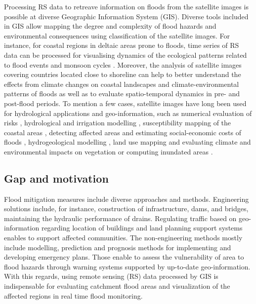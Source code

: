 \documentclass[water,article,submit,pdftex,moreauthors]{Definitions/mdpi}
\begin{document}
Processing RS data to retreave information on floods from the satellite images is possible at diverse Geographic Information System (GIS). Diverse tools included in GIS allow mapping the degree and complexity of flood hazards and environmental consequences using classification of the satellite images. For instance, for coastal regions in deltaic areas prone to floods, time series of RS data can be processed for visualising dynamics of the ecological patterns related to flood events and monsoon cycles \citep{RAZAVITERMEH2023100595,SINGHA2023316,MATHEW2021100861}. Moreover, the analysis of satellite images covering countries located close to shoreline can help to better understand the effects from climate changes on coastal landscapes and climate-environmental patterns of floods as well as to evaluate spatio-temporal dynamics in pre- and post-flood periods. To mention a few cases, satellite images have long been used for hydrological applications and geo-information, such as numerical evaluation of risks \citep{THAKUR2024130683}, hydrological and irrigation modelling \cite{SUN2024415}, susceptibility mapping of the coastal areas \cite{RAZAVITERMEH2023100595}, detecting affected areas and estimating social-economic costs of floods \cite{ZHENG2023101410,DUAN2024131010}, hydrogeological modelling \cite{BELL2021107451}, land use mapping and evaluating climate and environmental impacts on vegetation \cite{JARAMILLO2024526} or computing inundated areas \cite{ZUO2024}.

\subsection{Gap and motivation}

Flood mitigation measures include diverse approaches and methods. Engineering solutions include, for instance, construction of infrastructure, dams, and bridges, maintaining the hydraulic performance of drains. Regulating traffic based on geo-information regarding location of buildings and land planning support systems enables to support affected communities. The non-engineering methods mostly include modelling, prediction and prognosis methods for implementing and developing emergency plans. Those enable to assess the vulnerability of area to flood hazards through warning systems supported by up-to-date geo-information. With this regards, using remote sensing (RS) data processed by GIS is indispensable for evaluating catchment flood areas and visualization of the affected regions in real time flood monitoring.
\end{document}
